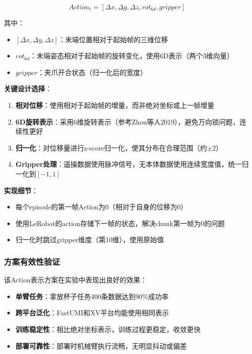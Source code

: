\begin{equation}
Action_t = [\Delta x, \Delta y, \Delta z, rot_{6d}, gripper]
\end{equation}

其中：
\begin{itemize}[leftmargin=2em]
    \item $[\Delta x, \Delta y, \Delta z]$：末端位置相对于起始帧的三维位移
    \item $rot_{6d}$：末端姿态相对于起始帧的旋转变化，使用6D表示（两个3维向量）
    \item $gripper$：夹爪开合状态（归一化后的宽度）
\end{itemize}

\textbf{关键设计选择}：
\begin{enumerate}[leftmargin=2em]
    \item \textbf{相对位移}：使用相对于起始帧的增量，而非绝对坐标或上一帧增量
    \item \textbf{6D旋转表示}：采用6维旋转表示（参考Zhou等人2019\cite{zhou2019continuity}），避免万向锁问题，连续性更好
    \item \textbf{归一化}：对位移量进行z-score归一化，使其分布在合理范围（约$\pm$2）
    \item \textbf{Gripper处理}：遥操数据使用脉冲信号，无本体数据使用连续宽度值，统一归一化到$[-1, 1]$
\end{enumerate}

\textbf{实现细节}：
\begin{itemize}[leftmargin=2em]
    \item 每个episode的第一帧Action为0（相对于自身的位移为0）
    \item 使用LeRobot的action存储下一帧的状态，解决chunk第一帧为0的问题
    \item 归一化时跳过gripper维度（第10维），使用原始值
\end{itemize}

\subsubsection{方案有效性验证}

该Action表示方案在实验中表现出良好的效果：
\begin{itemize}[leftmargin=2em]
    \item \textbf{单臂任务}：拿放杯子任务400条数据达到90\%成功率
    \item \textbf{跨平台泛化}：FastUMI和XV平台均能使用相同表示
    \item \textbf{训练稳定性}：相比绝对坐标表示，训练过程更稳定，收敛更快
    \item \textbf{部署可靠性}：部署时机械臂执行流畅，无明显抖动或偏差
\end{itemize}

